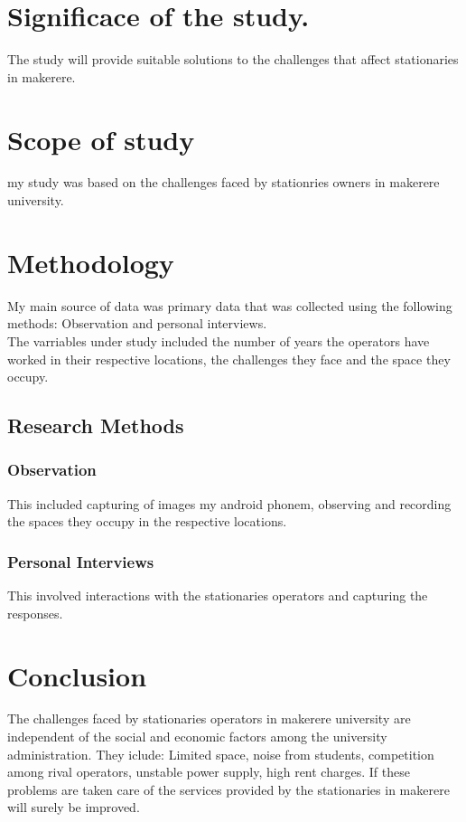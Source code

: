 \documentclass[a4paper,10pt]{article}
\begin{document}
\section{Significace of the study.}
The study will provide suitable solutions to the challenges that affect stationaries in makerere.
\section{Scope of study}
my study was based on the challenges faced by stationries owners in makerere university.

\section{Methodology}
My main source of data was primary data that was collected using the following methods: Observation and personal interviews.\\
The varriables under study included the number of years the operators have worked in their respective locations, the challenges they face and the space they occupy.
\subsection{Research Methods}
\subsubsection{Observation}
This included capturing of images my android phonem, observing and recording the spaces they occupy in the respective locations. 
\subsubsection{Personal Interviews}
This involved interactions with the stationaries operators and capturing the responses.
\section{Conclusion}
The challenges faced by stationaries operators in makerere university are independent of the social and economic factors among the university administration. They iclude: Limited space, noise from students, competition among rival operators, unstable power supply, high rent charges. If these problems are taken care of the services provided by the stationaries in makerere will surely be improved. 
\begin{thebibliography}{1}

\end{thebibliography}
\end{document}
